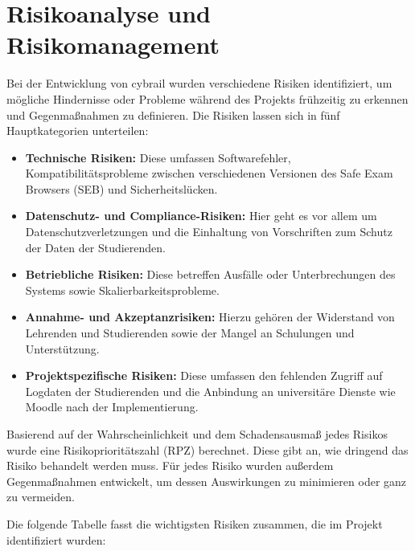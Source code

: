 \chapter{Risikoanalyse und Risikomanagement} \label{ch:Risikoanalyse}
Bei der Entwicklung von \gls{cybrail} wurden verschiedene Risiken identifiziert, um mögliche Hindernisse oder Probleme während des Projekts frühzeitig zu erkennen und Gegenmaßnahmen zu definieren. 
Die Risiken lassen sich in fünf Hauptkategorien unterteilen:

\begin{itemize} \item \textbf{Technische Risiken:} Diese umfassen Softwarefehler, Kompatibilitätsprobleme zwischen verschiedenen Versionen des Safe Exam Browsers (SEB) und Sicherheitslücken. 
\item \textbf{Datenschutz- und Compliance-Risiken:} Hier geht es vor allem um Datenschutzverletzungen und die Einhaltung von Vorschriften zum Schutz der Daten der Studierenden. 
\item \textbf{Betriebliche Risiken:} Diese betreffen Ausfälle oder Unterbrechungen des Systems sowie Skalierbarkeitsprobleme. 
\item \textbf{Annahme- und Akzeptanzrisiken:} Hierzu gehören der Widerstand von Lehrenden und Studierenden sowie der Mangel an Schulungen und Unterstützung. 
\item \textbf{Projektspezifische Risiken:} Diese umfassen den fehlenden Zugriff auf Logdaten der Studierenden und die Anbindung an universitäre Dienste wie Moodle nach der Implementierung. \end{itemize}

Basierend auf der Wahrscheinlichkeit und dem Schadensausmaß jedes Risikos wurde eine Risikoprioritätszahl (RPZ) berechnet. 
Diese gibt an, wie dringend das Risiko behandelt werden muss. Für jedes Risiko wurden außerdem Gegenmaßnahmen entwickelt, um dessen Auswirkungen zu minimieren oder ganz zu vermeiden.

Die folgende Tabelle fasst die wichtigsten Risiken zusammen, die im Projekt identifiziert wurden:

